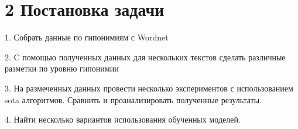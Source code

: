 \documentclass[12pt,twoside]{article}
\begin{document}
\section{2 Постановка задачи} 
{
1. Собрать данные по гипонимиям с Wordnet

2. C помощью полученных данных для нескольких текстов сделать различные разметки по уровню гипонимии

3. На размеченных данных провести несколько экспериментов с использованием sota алгоритмов. Сравнить и проанализировать полученные результаты.

4. Найти несколько вариантов использования обученных моделей. }
\bigskip
\bigskip
\bigskip

\end{document}
